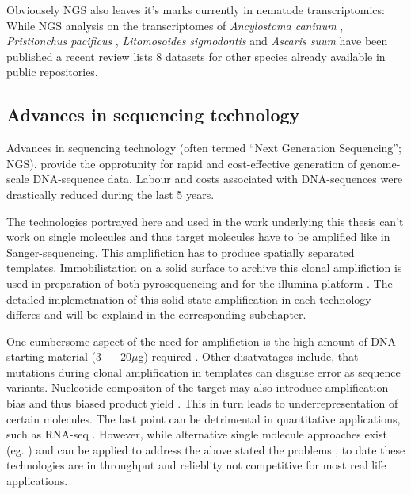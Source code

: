 Obviousely NGS also leaves it's marks currently in nematode
transcriptomics: While NGS analysis on the transcriptomes of
\textit{Ancylostoma caninum} \cite{pmid20470405}, \textit{Pristionchus
  pacificus} \cite{pmid20237107}, \textit{Litomosoides sigmodontis}
\cite{pmid20950480} and \textit{Ascaris suum} \cite{pmid21685128} have
been published a recent review \cite{pmid22044053} lists 8 datasets
for other species already available in public repositories.

\subsection{Advances in sequencing technology}
\label{sec:ad-seq}

Advances in sequencing technology (often termed ``Next Generation
Sequencing''; NGS), provide the opprotunity for rapid and
cost-effective generation of genome-scale DNA-sequence data.  Labour
and costs associated with DNA-sequences were drastically reduced
during the last 5 years.



The technologies portrayed here and used in the work underlying this
thesis can't work on single molecules and thus target molecules have
to be amplified like in Sanger-sequencing. This amplifiction has to
produce spatially separated templates. Immobilistation on a solid
surface to archive this clonal amplifiction is used in preparation of
both pyrosequencing and for the illumina-platform
\cite{pmid19997069}. The detailed implemetnation of this solid-state
amplification in each technology differes and will be explaind in the
corresponding subchapter.

One cumbersome aspect of the need for amplifiction is the high amount
of DNA starting-material ($3 -– 20 \mu$g) required
\cite{pmid19997069}. Other disatvatages include, that mutations during
clonal amplification in templates can disguise error as sequence
variants. Nucleotide compositon of the target may also introduce
amplification bias and thus biased product yield
\cite{pmid19327155}. This in turn leads to underrepresentation of
certain molecules. The last point can be detrimental in quantitative
applications, such as RNA-seq \cite{pmid19015660}. However, while
alternative single molecule approaches exist (eg. \cite{pmid21431759,
  pmid21572978}) and can be applied to address the above stated the
problems \cite{pmid21431761, pmid21957044}, to date these technologies
are in throughput and relieblity not competitive for most real life
applications.


